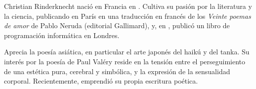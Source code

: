 Christian Rinderknecht nació en Francia
en . Cultiva su pasión por la literatura y la
ciencia, publicando en París en  una traducción en
francés de los \emph{Veinte poemas de amor} de Pablo Neruda (editorial
Gallimard), y, en , publicó un libro de
programación informática en Londres.

Aprecia la poesía asiática, en particular el arte japonés del haikú y
del tanka. Su interés por la poesía de Paul Valéry reside en la
tensión entre el perseguimiento de una estética pura, cerebral y
simbólica, y la expresión de la sensualidad corporal. Recientemente,
emprendió su propia escritura poética.
